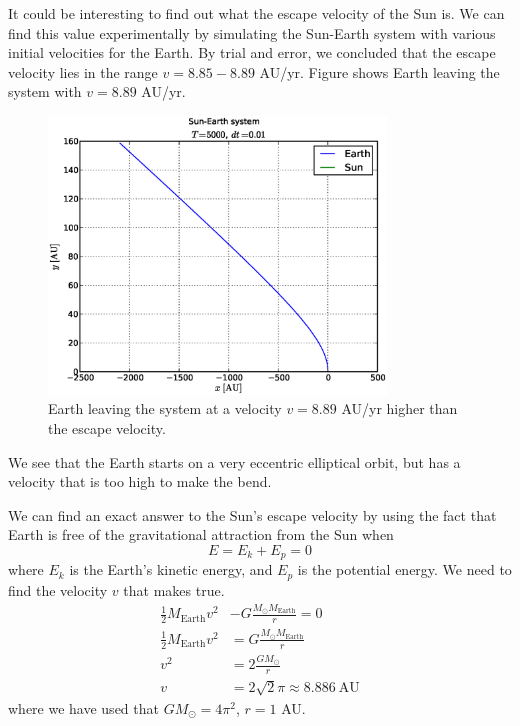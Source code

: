
It could be interesting to find out what the escape velocity of the Sun is. We
can find this value experimentally by simulating the Sun-Earth system with
various initial velocities for the Earth. By trial and error, we concluded that
the escape velocity lies in the range $v = 8.85 - 8.89$ AU/yr. Figure
 shows Earth leaving the system with $v = 8.89$ AU/yr.
%
\begin{figure}[htpb]
	\centering
	\includegraphics[width=0.8\textwidth]{figures/sun_earth_T5000_dt1e-2}
	\caption{Earth leaving the system at a velocity $v = 8.89$ AU/yr higher
		than the escape	velocity.}
	\label{fig:escapevel}
\end{figure}
%
We see that the Earth starts on a very eccentric elliptical orbit, but has a
velocity that is too high to make the bend.

We can find an exact answer to the Sun's escape velocity by using the fact that
Earth is free of the gravitational attraction from the Sun when
\begin{equation}
	E = E_k + E_p = 0
	\label{eq:Eequal0}
\end{equation}
where $E_k$ is the Earth's kinetic energy, and $E_p$ is the potential energy. We
need to find the velocity $v$ that makes  true.
%
\begin{align*}
	\frac{1}{2}M_{\text{Earth}}v^2 &- G \frac{M_{\odot} M_{\text{Earth}}}{r}
	= 0 \\
	\frac{1}{2}M_{\text{Earth}}v^2 &= G \frac{M_{\odot} M_{\text{Earth}}}{r} \\
	v^2 &= 2\frac{GM_{\odot}}{r} \\
	v &= 2\sqrt{2}\pi \approx 8.886 \ \text{AU} 
\end{align*}
%
where we have used that $GM_{\odot} = 4\pi^2$, $r = 1$ AU.
